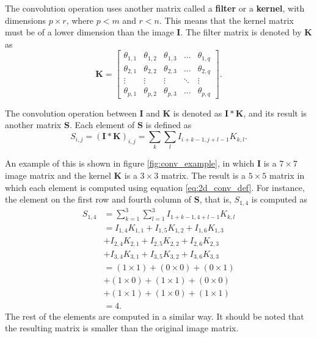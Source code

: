 The convolution operation uses another matrix called a \textbf{filter} or a \textbf{kernel}, with dimensions $p \times r$, where $p < m$ and $r < n$. This means that the kernel matrix must be of a lower dimension than the image $\boldsymbol{I}$. The filter matrix is denoted by $\boldsymbol{K}$ as
\begin{equation}
  \boldsymbol{K} =
    \begin{bmatrix}
      \theta_{1,1} & \theta_{1,2} & \theta_{1,3} & \dots  & \theta_{1,q} \\
      \theta_{2,1} & \theta_{2,2} & \theta_{2,3} & \dots  & \theta_{2,q} \\
      \vdots & \vdots & \vdots & \ddots & \vdots \\
      \theta_{p,1} & \theta_{p,2} & \theta_{p,3} & \dots  & \theta_{p,q}
    \end{bmatrix}.
\end{equation}

The convolution operation between $\boldsymbol{I}$ and $\boldsymbol{K}$ is denoted as $\boldsymbol{I} * \boldsymbol{K}$, and its result is another matrix $\boldsymbol{S}$. Each element of $\boldsymbol{S}$ is defined as
\begin{equation}
  \label{eq:2d_conv_def}
  S_{i,j} = (\boldsymbol{I} * \boldsymbol{K})_{i,j} = \sum_{k} \sum_{l} I_{i+k-1,j+l-1} K_{k, l}.
\end{equation}

An example of this is shown in figure \ref{fig:conv_example}, in which $\boldsymbol{I}$ is a $7 \times 7$ image matrix and the kernel $\boldsymbol{K}$ is a $3 \times 3$ matrix. The result is a $5 \times 5$ matrix in which each element is computed using equation \eqref{eq:2d_conv_def}. For instance, the element on the first row and fourth column of $\boldsymbol{S}$, that is, $S_{1,4}$ is computed as
\begin{equation}
  \begin{split}
      S_{1,4} & =
      \sum_{k=1}^3 \sum_{l=1}^3 I_{1+k-1,4+l-1} K_{k, l} \\
      & = I_{1,4}K_{1,1} + I_{1,5}K_{1,2} + I_{1,6}K_{1,3} \\
      & + I_{2,4}K_{2,1} + I_{2,5}K_{2,2} + I_{2,6}K_{2,3} \\
      & + I_{3,4}K_{3,1} + I_{3,5}K_{3,2} + I_{3,6}K_{3,3} \\
      & = ( 1 \times 1 ) + ( 0 \times 0 ) + ( 0 \times 1 ) \\
      & + ( 1 \times 0 ) + ( 1 \times 1 ) + ( 0 \times 0 ) \\
      & + ( 1 \times 1 ) + ( 1 \times 0 ) + ( 1 \times 1 ) \\
      & = 4.
  \end{split}
\end{equation}
The rest of the elements are computed in a similar way. It should be noted that the resulting matrix is smaller than the original image matrix.

